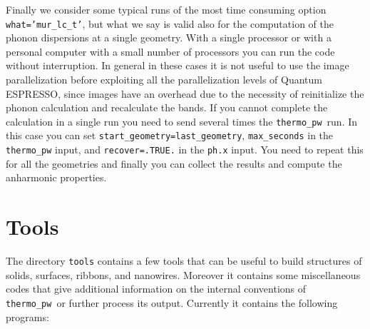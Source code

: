 \documentclass[12pt,a4paper]{article}
\def\qe{{\sc Quantum ESPRESSO}}
\def\thermo{\texttt{thermo\_pw}}
\begin{document}
Finally we consider some typical runs of the most time consuming option
\texttt{what='mur\_lc\_t'}, but what we say is valid also for the computation
of the phonon dispersions at a single geometry.
With a single processor or with a personal computer with a small number of 
processors you can run the code without interruption.
In general in these cases it is not useful to use the image parallelization
before exploiting all the parallelization levels of \qe, since 
images have an overhead due to the necessity of reinitialize the phonon
calculation and recalculate the bands.
If you cannot complete the calculation in a single run 
you need to send several times the \thermo\ run. 
In this case you can set \texttt{start\_geometry=last\_geometry},
\texttt{max\_seconds} in the \texttt{thermo\_pw} input,
and \texttt{recover=.TRUE.} in the \texttt{ph.x} input. You need to
repeat this for all the geometries and finally you can collect the results
and compute the anharmonic properties.




\newpage
\section{\color{coral}Tools}

The directory \texttt{tools} contains a few tools that can be useful to build
structures of solids, surfaces, ribbons, and nanowires. Moreover it 
contains some miscellaneous codes that give additional information
on the internal conventions of \thermo\ or further process its output. 
Currently it contains the following programs:
\end{document}
